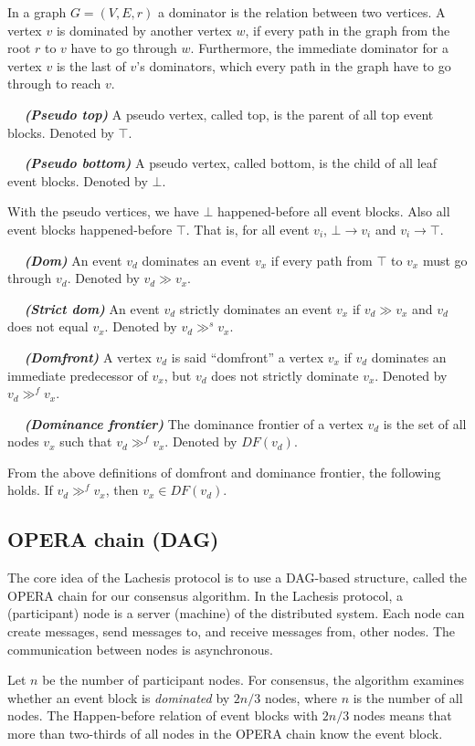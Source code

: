 \documentclass{article}
\newcommand{\dfnn}[2]{$\quad$ \textbf{\emph{(#1)}} {#2}}
\newcommand{\dom}{\gg}
\newcommand{\sdom}{\gg^{s}}
\newcommand{\domf}{\gg^{f}}
\newcommand{\hbefore}{\rightarrow}
\begin{document}
In a graph $G=(V, E, r)$ a dominator is the relation between two vertices. A vertex $v$ is dominated by another vertex $w$, if every path in the graph from the root $r$ to $v$ have to go through $w$. Furthermore, the immediate dominator for a vertex $v$ is the last of $v$’s dominators, which every path in the graph have to go through to reach $v$.


\dfnn{Pseudo top}{A pseudo vertex, called top, is the parent of all top event blocks. Denoted by $\top$.}

\dfnn{Pseudo bottom}{A pseudo vertex, called bottom, is the child of all leaf event blocks. Denoted by $\bot$.}

With the pseudo vertices, we have $\bot$ happened-before all event blocks. Also all event blocks happened-before $\top$. That is, for all event $v_i$, $\bot \hbefore v_i$ and $v_i \hbefore \top$.

\dfnn{Dom}{An event $v_d$ dominates an event $v_x$ if every path from $\top$ to $v_x$ must go through $v_d$. Denoted by $v_d \dom v_x$.}

\dfnn{Strict dom}{An event $v_d$ strictly dominates an event $v_x$ if $v_d \dom v_x$ and $v_d$ does not equal $v_x$. Denoted by $v_d \sdom v_x$.}

\dfnn{Domfront}{A vertex $v_d$ is said ``domfront'' a vertex $v_x$ if  $v_d$ dominates an immediate predecessor of $v_x$, but $v_d$ does not strictly dominate $v_x$. Denoted by $v_d \domf v_x$.}

\dfnn{Dominance frontier}{The dominance frontier of a vertex $v_d$ is the set of all nodes $v_x$ such that $v_d \domf v_x$. Denoted by $DF(v_d)$.}

From the above definitions of domfront and dominance frontier, the following holds. If $v_d \domf v_x$, then $v_x \in DF(v_d)$.
	 
\subsection{OPERA chain (DAG)}

The core idea of the Lachesis protocol is to use a DAG-based structure, called the OPERA chain for our consensus algorithm. 
In the Lachesis protocol, a (participant) node is a server (machine) of the distributed system.
Each node can create messages, send messages to, and receive messages from, other nodes. The communication between nodes is asynchronous. 

Let $n$ be the number of participant nodes.
For consensus, the algorithm examines whether an event block is \emph{dominated} by $2n/3$ nodes, where $n$ is the number of all nodes. The Happen-before relation of event blocks with $2n/3$ nodes means that more than two-thirds of all nodes in the OPERA chain know the event block. 
\end{document}
